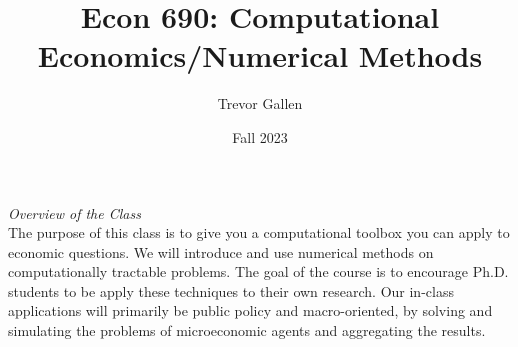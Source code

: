 \documentclass[a4paper]{article}
\title{Econ 690: Computational Economics/Numerical Methods}
\author{Trevor Gallen}
\date{Fall 2023}
\begin{document}


\maketitle
\emph{Overview of the Class}\\
The purpose of this class is to give you a computational toolbox you can apply to economic questions.  We will introduce and use numerical methods on computationally tractable problems.  The goal of the course is to encourage Ph.D. students to be apply these techniques to their own research.  Our in-class applications will primarily be public policy and macro-oriented, by solving and simulating the problems of microeconomic agents and aggregating the results. \\
\end{document}

